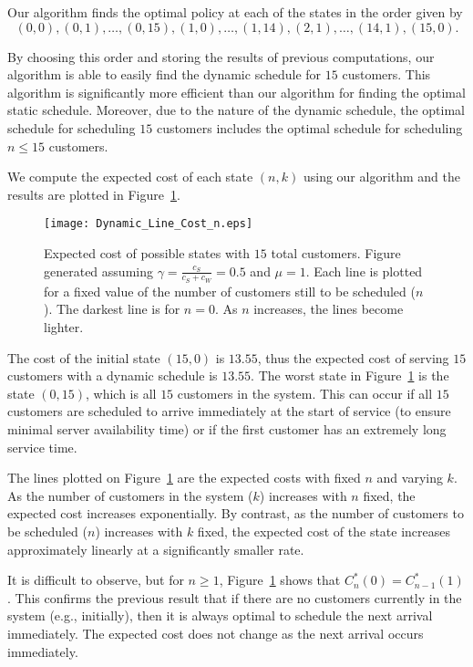 Our algorithm finds the optimal policy at each of the states in the order given by
\begin{equation}
	(0, 0), (0, 1), \ldots, (0, 15), (1, 0), \ldots, (1, 14), (2, 1), \ldots, (14, 1), (15, 0).
\end{equation}

By choosing this order and storing the results of previous computations, our algorithm is able to easily find the dynamic schedule for $15$ customers. This algorithm is significantly more efficient than our algorithm for finding the optimal static schedule. Moreover, due to the nature of the dynamic schedule, the optimal schedule for scheduling $15$ customers includes the optimal schedule for scheduling $n \leq 15$ customers.

We compute the expected cost of each state $(n, k)$ using our algorithm and the results are plotted in Figure~\ref{fig:Dynamic_Cost_15}.
\begin{figure}[htb]
	\centering
	\texttt{[image: Dynamic\_Line\_Cost\_n.eps]}
	\caption{Expected cost of possible states with $15$ total customers. Figure generated assuming $\gamma = \frac{c_{S}}{c_{S} + c_{W}} = 0.5$ and $\mu = 1$. Each line is plotted for a fixed value of the number of customers still to be scheduled ($n$). The darkest line is for $n = 0$. As $n$ increases, the lines become lighter.}
	\label{fig:Dynamic_Cost_15}
\end{figure}

The cost of the initial state $(15, 0)$ is $13.55$, thus the expected cost of serving $15$ customers with a dynamic schedule is $13.55$. The worst state in Figure~\ref{fig:Dynamic_Cost_15} is the state $(0, 15)$, which is all $15$ customers in the system. This can occur if all $15$ customers are scheduled to arrive immediately at the start of service (to ensure minimal server availability time) or if the first customer has an extremely long service time.

The lines plotted on Figure~\ref{fig:Dynamic_Cost_15} are the expected costs with fixed $n$ and varying $k$. As the number of customers in the system ($k$) increases with $n$ fixed, the expected cost increases exponentially. By contrast, as the number of customers to be scheduled ($n$) increases with $k$ fixed, the expected cost of the state increases approximately linearly at a significantly smaller rate.

It is difficult to observe, but for $n \geq 1$, Figure~\ref{fig:Dynamic_Cost_15} shows that $C_{n}^{*} (0) = C_{n - 1}^{*} (1)$. This confirms the previous result that if there are no customers currently in the system (e.g., initially), then it is always optimal to schedule the next arrival immediately. The expected cost does not change as the next arrival occurs immediately.

